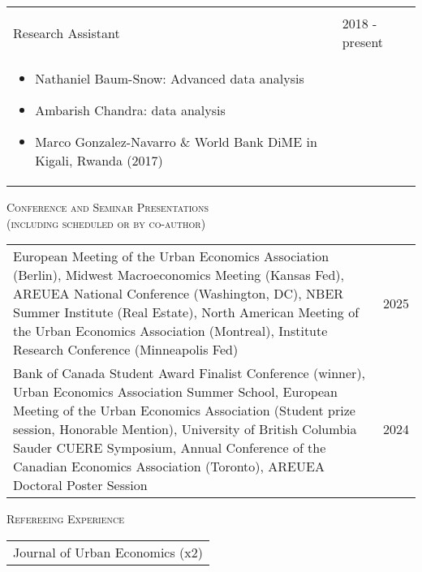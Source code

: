 \documentclass[11pt]{amsart}
\begin{document}
\begin{tabular}{ p{12.5cm} p{5cm}}
                   &             \\
Research Assistant & 2018 - present \\
\begin{itemize}
  \item Nathaniel Baum-Snow: Advanced data analysis 
  \item Ambarish Chandra: data analysis
  \item Marco Gonzalez-Navarro \& World Bank DiME in Kigali, Rwanda (2017)
\end{itemize}      &             


\end{tabular}





\normalsize

\vspace{0.4cm}
\LARGE
\textsc{Conference and Seminar Presentations \scriptsize \\ (including scheduled or by co-author)}
\vspace{0.2cm}
\normalsize

\begin{tabular}{ p{12.5cm} p{5cm}}
European Meeting of the Urban Economics Association (Berlin), Midwest Macroeconomics Meeting (Kansas Fed), AREUEA National Conference (Washington, DC), NBER Summer Institute (Real Estate), North American Meeting of the Urban Economics Association (Montreal), Institute Research Conference (Minneapolis Fed)   & 2025 \\	
	
Bank of Canada Student Award Finalist Conference (winner), Urban Economics Association Summer School, European Meeting of the Urban Economics Association (Student prize session, Honorable Mention), University of British Columbia Sauder CUERE Symposium, Annual Conference of the Canadian Economics Association (Toronto),  AREUEA Doctoral Poster Session   & 2024  \\	

\end{tabular}


\vspace{0.4cm}

\LARGE
\textsc{Refereeing Experience}
\vspace{0.2cm}
\normalsize

\begin{tabular}{ p{17.5cm} }
Journal of Urban Economics (x2)  \\
\end{tabular}
 
\end{document}
